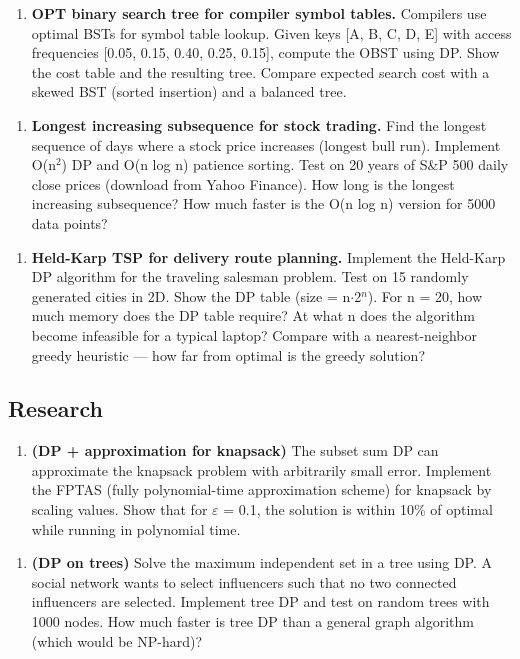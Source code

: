 \begin{enumerate}
\item \textbf{OPT binary search tree for compiler symbol tables.} Compilers use optimal BSTs for symbol table lookup. Given keys [A, B, C, D, E] with access frequencies [0.05, 0.15, 0.40, 0.25, 0.15], compute the OBST using DP. Show the cost table and the resulting tree. Compare expected search cost with a skewed BST (sorted insertion) and a balanced tree.
\end{enumerate}

\begin{enumerate}
\item \textbf{Longest increasing subsequence for stock trading.} Find the longest sequence of days where a stock price increases (longest bull run). Implement O(n$^{2}$) DP and O(n log n) patience sorting. Test on 20 years of S\&P 500 daily close prices (download from Yahoo Finance). How long is the longest increasing subsequence? How much faster is the O(n log n) version for 5000 data points?
\end{enumerate}

\begin{enumerate}
\item \textbf{Held-Karp TSP for delivery route planning.} Implement the Held-Karp DP algorithm for the traveling salesman problem. Test on 15 randomly generated cities in 2D. Show the DP table (size = n$\cdot $2$^{n}$). For n = 20, how much memory does the DP table require? At what n does the algorithm become infeasible for a typical laptop? Compare with a nearest-neighbor greedy heuristic — how far from optimal is the greedy solution?
\end{enumerate}

\subsection{Research}

\begin{enumerate}
\item \textbf{(DP + approximation for knapsack)} The subset sum DP can approximate the knapsack problem with arbitrarily small error. Implement the FPTAS (fully polynomial-time approximation scheme) for knapsack by scaling values. Show that for $\varepsilon $ = 0.1, the solution is within 10\% of optimal while running in polynomial time.
\end{enumerate}

\begin{enumerate}
\item \textbf{(DP on trees)} Solve the maximum independent set in a tree using DP. A social network wants to select influencers such that no two connected influencers are selected. Implement tree DP and test on random trees with 1000 nodes. How much faster is tree DP than a general graph algorithm (which would be NP-hard)?
\end{enumerate}

